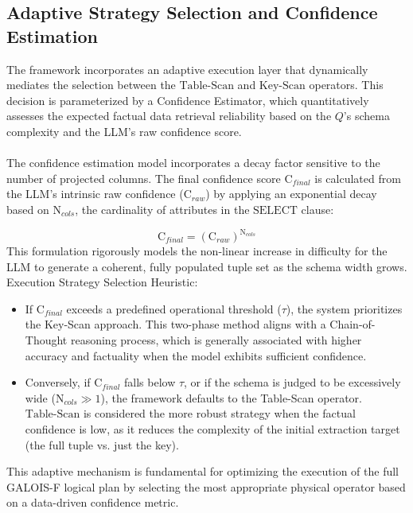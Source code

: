 \newpage
\subsection{Adaptive Strategy Selection and Confidence Estimation}\label{subsec:conf_est}
The framework incorporates an adaptive execution layer that dynamically mediates the selection between the $\text{Table-Scan}$ and $\text{Key-Scan}$ operators. This decision is parameterized by a Confidence Estimator, which quantitatively assesses the expected factual data retrieval reliability based on the $Q$'s schema complexity and the LLM's raw confidence score.
\\\\
The confidence estimation model incorporates a decay factor sensitive to the number of projected columns. The final confidence score $\text{C}_{final}$ is calculated from the LLM's intrinsic raw confidence ($\text{C}_{raw}$) by applying an exponential decay based on $\text{N}_{cols}$, the cardinality of attributes in the $\text{SELECT}$ clause:

$$
\text{C}_{final} = (\text{C}_{raw})^{\text{N}_{cols}}
$$
This formulation rigorously models the non-linear increase in difficulty for the LLM to generate a coherent, fully populated tuple set as the schema width grows.\\
Execution Strategy Selection Heuristic:
\begin{itemize}
    \item If $\text{C}_{final}$ exceeds a predefined operational threshold ($\tau$), the system prioritizes the Key-Scan approach. This two-phase method aligns with a Chain-of-Thought reasoning process, which is generally associated with higher accuracy and factuality when the model exhibits sufficient confidence.
    \item Conversely, if $\text{C}_{final}$ falls below $\tau$, or if the schema is judged to be excessively wide ($\text{N}_{cols} \gg 1$), the framework defaults to the Table-Scan operator. $\text{Table-Scan}$ is considered the more robust strategy when the factual confidence is low, as it reduces the complexity of the initial extraction target (the full tuple vs. just the key).
\end{itemize}
This adaptive mechanism is fundamental for optimizing the execution of the full GALOIS-F logical plan by selecting the most appropriate physical operator based on a data-driven confidence metric.
